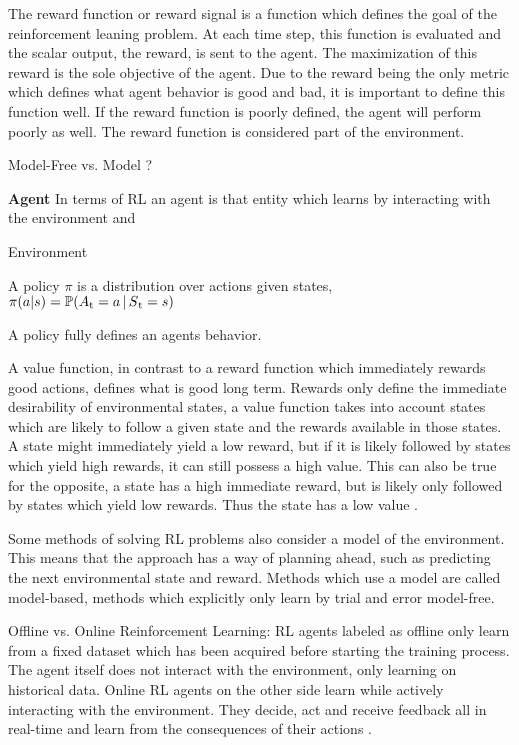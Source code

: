 The reward function or reward signal is a function which defines the goal of the reinforcement leaning problem.
At each time step, this function is evaluated and the scalar output, the reward, is sent to the agent.
The maximization of this reward is the sole objective of the agent.
Due to the reward being the only metric which defines what agent behavior is good and bad, it is important to define this function well.
If the reward function is poorly defined, the agent will perform poorly as well.
The reward function is considered part of the environment.
\parencite{sutton2018reinforcement}



\parencite{weng2018bandit}
\parencite{sutton2018reinforcement}

Model-Free vs. Model ?

\textbf{Agent}
In terms of RL an agent is that entity which learns by interacting with the environment and 


Environment

\begin{definition*}
	A policy $\pi$ is a distribution over actions given states,\\
	$\pi(a|s) = \mathbb{P}(A\textsubscript{t} = a\,|\,S\textsubscript{t} = s)$
\end{definition*}
A policy fully defines an agents behavior. 


A value function, in contrast to a reward function which immediately rewards good actions, defines what is good long term. 
Rewards only define the immediate desirability of environmental states, a value function takes into account states which are likely to follow a given state and the rewards available in those states.
A state might immediately yield a low reward, but if it is likely followed by states which yield high rewards, it can still possess a high value.
This can also be true for the opposite, a state has a high immediate reward, but is likely only followed by states which yield low rewards. Thus the state has a low value \parencite{sutton2018reinforcement}.

Some methods of solving RL problems also consider a model of the environment. This means that the approach has a way of planning ahead, such as predicting the next environmental state and reward.
Methods which use a model are called model-based, methods which explicitly only learn by trial and error model-free\parencite{sutton2018reinforcement}.

Offline vs. Online Reinforcement Learning: 
RL agents labeled as offline only learn from a fixed dataset which has been acquired before starting the training process.
The agent itself does not interact with the environment, only learning on historical data.
Online RL agents on the other side learn while actively interacting with the environment.
They decide, act and receive feedback all in real-time and learn from the consequences of their actions \parencite{schrittwieser2021online}.




